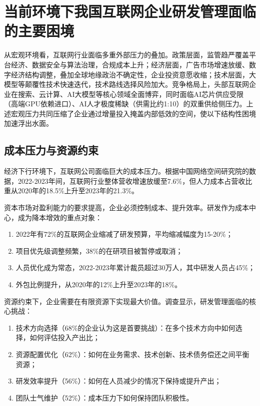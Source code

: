 \section{当前环境下我国互联网企业研发管理面临的主要困境}

从宏观环境看，互联网行业面临多重外部压力的叠加。政策层面，监管趋严覆盖平台经济、数据安全与算法治理，合规成本上升\cite{cac2023internet}；经济层面，广告市场增速放缓、数字经济结构调整，叠加全球地缘政治不确定性，企业投资意愿收缩\cite{du2024mixed,li2022configuration}；技术层面，大模型等颠覆性技术快速迭代，技术路线选择风险加大\cite{li2024scientific,zheng2021disruptive}。竞争格局上，头部互联网企业在搜索、云计算、AI大模型等核心领域全面博弈，同时面临AI芯片供应受限（高端GPU依赖进口）、AI人才极度稀缺（供需比约1:10）的双重供给侧压力\cite{porter1980competitive}。上述宏观压力共同压缩了企业通过增量投入掩盖内部低效的空间，使以下结构性困境加速浮出水面。

\subsection{成本压力与资源约束}

经济下行环境下，互联网公司面临巨大的成本压力\cite{du2024mixed,li2022configuration}。根据中国网络空间研究院的数据，2022-2023年间，互联网行业整体营收增速放缓至7.6\%，但人力成本占营收比重从2020年的18.5\%上升至2023年的21.3\%\cite{cac2023internet}。

资本市场对盈利能力的要求提高，企业必须控制成本、提升效率。研发作为成本中心，成为降本增效的重点对象：
\begin{enumerate}
\item 2022年有72\%的互联网企业缩减了研发预算，平均缩减幅度为15-20\%；
\item 项目优先级调整频繁，38\%的在研项目被暂停或取消；
\item 人员优化成为常态，2022-2023年累计裁员超过30万人，其中研发人员占45\%；
\item 外包比例提升，从2020年的12\%上升至2023年的18\%\cite{china100internet2023}。
\end{enumerate}

资源约束下，企业需要在有限资源下实现最大价值。调查显示，研发管理面临的核心挑战：
\begin{enumerate}
\item 技术方向选择（68\%的企业认为这是首要挑战）：在多个技术方向中如何选择，如何评估投入产出比；
\item 资源配置优化（62\%）：如何在业务需求、技术创新、技术债务偿还之间平衡资源；
\item 研发效率提升（56\%）：如何在人员减少的情况下保持或提升产出；
\item 团队士气维护（52\%）：成本压力下如何保持团队积极性\cite{mckinsey2023tech}。
\end{enumerate}

